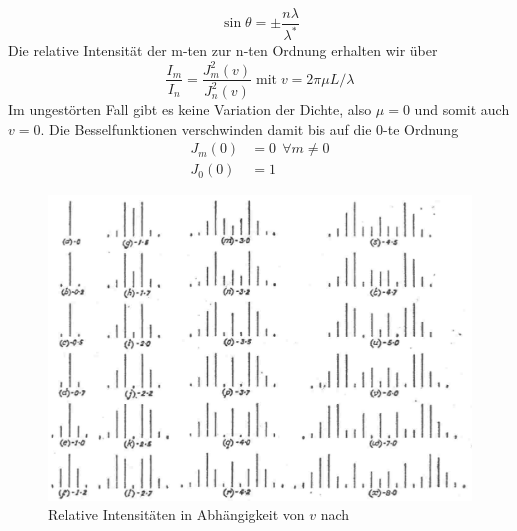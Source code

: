 \begin{equation}
  \sin \theta = \pm \frac{n \lambda}{\lambda^*} 
\end{equation}
Die relative Intensität der m-ten zur n-ten Ordnung erhalten wir über
\begin{equation}
  \frac{I_m}{I_n} = \frac{J_m^2(v)}{J_n^2(v)}  \; \text{mit} \; v = 2 \pi \mu L / \lambda
\end{equation}
Im ungestörten Fall gibt es keine Variation der Dichte, also $\mu = 0$ und somit auch $v=0$. Die Besselfunktionen verschwinden damit bis auf die 0-te Ordnung
\begin{align}
 J_m(0) & = 0 \ \ \forall m \neq 0 \\
 J_0(0) & = 1
\end{align}
 

\begin{figure}[H]
 \centering \includegraphics{Bilder/bessel-funktionen.jpg}
 \caption{Relative Intensitäten in Abhängigkeit von $v$ nach \cite{Raman}}
\end{figure}


